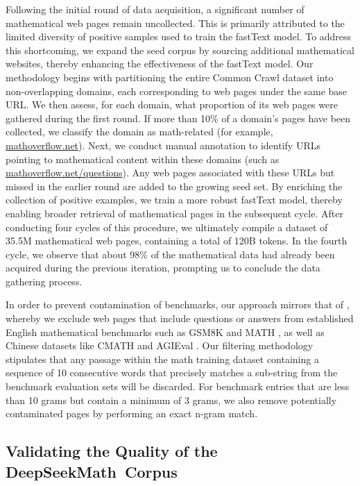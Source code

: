 \begin{itemize}[topsep=0pt]
Following the initial round of data acquisition, a significant number of mathematical web pages remain uncollected. This is primarily attributed to the limited diversity of positive samples used to train the fastText model. To address this shortcoming, we expand the seed corpus by sourcing additional mathematical websites, thereby enhancing the effectiveness of the fastText model. Our methodology begins with partitioning the entire Common Crawl dataset into non-overlapping domains, each corresponding to web pages under the same base URL. We then assess, for each domain, what proportion of its web pages were gathered during the first round. If more than 10\% of a domain’s pages have been collected, we classify the domain as math-related (for example, \url{mathoverflow.net}). Next, we conduct manual annotation to identify URLs pointing to mathematical content within these domains (such as \url{mathoverflow.net/questions}). Any web pages associated with these URLs but missed in the earlier round are added to the growing seed set. By enriching the collection of positive examples, we train a more robust fastText model, thereby enabling broader retrieval of mathematical pages in the subsequent cycle. After conducting four cycles of this procedure, we ultimately compile a dataset of 35.5M mathematical web pages, containing a total of 120B tokens. In the fourth cycle, we observe that about 98\% of the mathematical data had already been acquired during the previous iteration, prompting us to conclude the data gathering process.

In order to prevent contamination of benchmarks, our approach mirrors that of \cite{deepseek-coder}, whereby we exclude web pages that include questions or answers from established English mathematical benchmarks such as GSM8K \citep{gsm8k} and MATH \citep{MATH}, as well as Chinese datasets like CMATH \citep{wei2023cmath} and AGIEval \citep{agieval}. Our filtering methodology stipulates that any passage within the math training dataset containing a sequence of 10 consecutive words that precisely matches a sub-string from the benchmark evaluation sets will be discarded. For benchmark entries that are less than 10 grams but contain a minimum of 3 grams, we also remove potentially contaminated pages by performing an exact n-gram match.

\subsection{Validating the Quality of the DeepSeekMath~Corpus}


\end{itemize}

